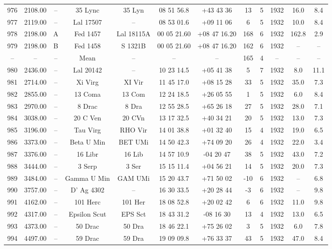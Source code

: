 \begin{table}
\begin{tabular}{cccccccccccc}
976 & 2108.00 & -- & 35 Lync & 35 Lyn & 08 51 56.8 & +43 43 36 & 13 & 5 & 1932 & 16.0 & 8.4 \\
977 & 2119.00 & -- & Lal 17507 & -- & 08 53 01.6 & +09 11 06 & 6 & 5 & 1932 & 10.0 & 8.4 \\
978 & 2198.00 & A & Fed    1457 & Lal 18115A & 00 05 21.60 & +08 47 16.20 & 168 & 6 & 1932 & 162.8 & 2.9 \\
979 & 2198.00 & B & Fed    1458 & S 1321B & 00 05 21.60 & +08 47 16.20 & 162 & 6 & 1932 & -- & -- \\
-- & -- & -- & Mean & -- & -- & -- & 165 & 4 & -- & -- & -- \\
980 & 2436.00 & -- & Lal 20142 & -- & 10 23 14.5 & +05 41 38 & 5 & 7 & 1932 & 8.0 & 11.1 \\
981 & 2714.00 & -- & Xi Virg & XI Vir & 11 45 17.0 & +08 15 28 & 33 & 5 & 1932 & 35.0 & 7.3 \\
982 & 2855.00 & -- & 13 Coma & 13 Com & 12 24 18.5 & +26 05 55 & 1 & 5 & 1932 & 6.0 & 8.4 \\
983 & 2970.00 & -- & 8    Drac & 8 Dra & 12 55 28.5 & +65 26 18 & 27 & 5 & 1932 & 28.0 & 7.1 \\
984 & 3038.00 & -- & 20 C Ven & 20 CVn & 13 17 32.5 & +40 34 21 & 20 & 5 & 1932 & 13.0 & 7.3 \\
985 & 3196.00 & -- & Tau Virg & RHO Vir & 14 01 38.8 & +01 32 40 & 15 & 4 & 1932 & 19.0 & 6.5 \\
986 & 3373.00 & -- & Beta U Min & BET UMi & 14 50 42.3 & +74 09 20 & 26 & 4 & 1932 & 22.0 & 3.4 \\
987 & 3376.00 & -- & 16 Libr & 16 Lib & 14 57 10.9 & -04 20 47 & 38 & 5 & 1932 & 43.0 & 7.2 \\
988 & 3444.00 & -- & 3 Serp & 3 Ser & 15 15 11.4 & +04 56 21 & 14 & 5 & 1932 & 20.0 & 7.3 \\
989 & 3484.00 & -- & Gamma U Min & GAM UMi & 15 20 43.7 & +71 50 02 & -10 & 6 & 1932 & -- & 6.8 \\
990 & 3757.00 & -- & D' Ag 4302 & -- & 16 30 33.5 & +20 28 44 & -3 & 6 & 1932 & -- & 9.8 \\
991 & 4162.00 & -- & 101 Herc & 101 Her & 18 08 52.8 & +20 02 42 & 6 & 6 & 1932 & 11.0 & 9.8 \\
992 & 4317.00 & -- & Epsilon Scut & EPS Sct & 18 43 31.2 & -08 16 30 & 13 & 4 & 1932 & 13.0 & 6.5 \\
993 & 4373.00 & -- & 50 Drac & 50 Dra & 18 46 22.1 & +75 26 02 & 3 & 5 & 1932 & 6.0 & 7.8 \\
994 & 4497.00 & -- & 59 Drac & 59 Dra & 19 09 09.8 & +76 33 37 & 43 & 5 & 1932 & 47.0 & 8.4 \\

\end{tabular}
\end{table}
